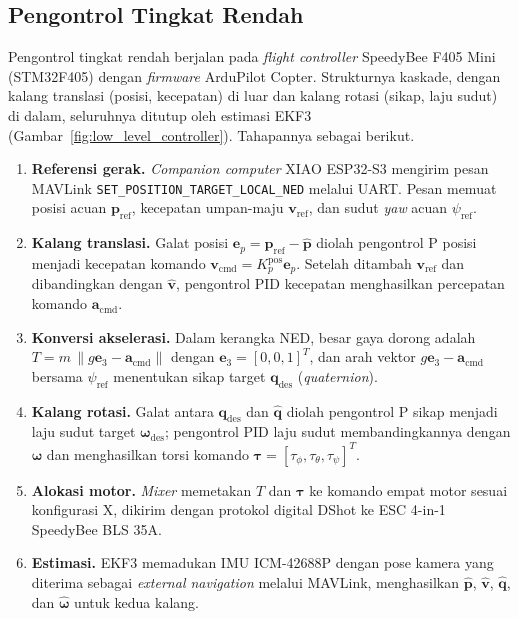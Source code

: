 \documentclass[12pt,a4paper]{report}
\begin{document}
\subsection{Pengontrol Tingkat Rendah}

Pengontrol tingkat rendah berjalan pada \textit{flight controller} SpeedyBee F405 Mini (STM32F405) dengan \textit{firmware} ArduPilot Copter. Strukturnya kaskade, dengan kalang translasi (posisi, kecepatan) di luar dan kalang rotasi (sikap, laju sudut) di dalam, seluruhnya ditutup oleh estimasi EKF3 (Gambar~\ref{fig:low_level_controller}). Tahapannya sebagai berikut.
\begin{enumerate}
    \item \textbf{Referensi gerak.} \textit{Companion computer} XIAO ESP32-S3 mengirim pesan MAVLink \texttt{SET\_}\allowbreak\texttt{POSITION\_}\allowbreak\texttt{TARGET\_}\allowbreak\texttt{LOCAL\_}\allowbreak\texttt{NED} melalui UART. Pesan memuat posisi acuan $\mathbf{p}_{\mathrm{ref}}$, kecepatan umpan-maju $\mathbf{v}_{\mathrm{ref}}$, dan sudut \textit{yaw} acuan $\psi_{\mathrm{ref}}$.
    \item \textbf{Kalang translasi.} Galat posisi $\mathbf{e}_p = \mathbf{p}_{\mathrm{ref}} - \hat{\mathbf{p}}$ diolah pengontrol P posisi menjadi kecepatan komando $\mathbf{v}_{\mathrm{cmd}} = K_p^{\mathrm{pos}}\mathbf{e}_p$. Setelah ditambah $\mathbf{v}_{\mathrm{ref}}$ dan dibandingkan dengan $\hat{\mathbf{v}}$, pengontrol PID kecepatan menghasilkan percepatan komando $\mathbf{a}_{\mathrm{cmd}}$.
    \item \textbf{Konversi akselerasi.} Dalam kerangka NED, besar gaya dorong adalah $T = m\,\lVert g\mathbf{e}_3 - \mathbf{a}_{\mathrm{cmd}} \rVert$ dengan $\mathbf{e}_3 = [0, 0, 1]^T$, dan arah vektor $g\mathbf{e}_3 - \mathbf{a}_{\mathrm{cmd}}$ bersama $\psi_{\mathrm{ref}}$ menentukan sikap target $\mathbf{q}_{\mathrm{des}}$ (\textit{quaternion}).
    \item \textbf{Kalang rotasi.} Galat antara $\mathbf{q}_{\mathrm{des}}$ dan $\hat{\mathbf{q}}$ diolah pengontrol P sikap menjadi laju sudut target $\boldsymbol{\omega}_{\mathrm{des}}$; pengontrol PID laju sudut membandingkannya dengan $\hat{\boldsymbol{\omega}}$ dan menghasilkan torsi komando $\boldsymbol{\tau} = [\tau_\phi, \tau_\theta, \tau_\psi]^T$.
    \item \textbf{Alokasi motor.} \textit{Mixer} memetakan $T$ dan $\boldsymbol{\tau}$ ke komando empat motor sesuai konfigurasi X, dikirim dengan protokol digital DShot ke ESC 4-in-1 SpeedyBee BLS 35A.
    \item \textbf{Estimasi.} EKF3 memadukan IMU ICM-42688P dengan pose kamera yang diterima sebagai \textit{external navigation} melalui MAVLink, menghasilkan $\hat{\mathbf{p}}$, $\hat{\mathbf{v}}$, $\hat{\mathbf{q}}$, dan $\hat{\boldsymbol{\omega}}$ untuk kedua kalang.
\end{enumerate}
\end{document}
